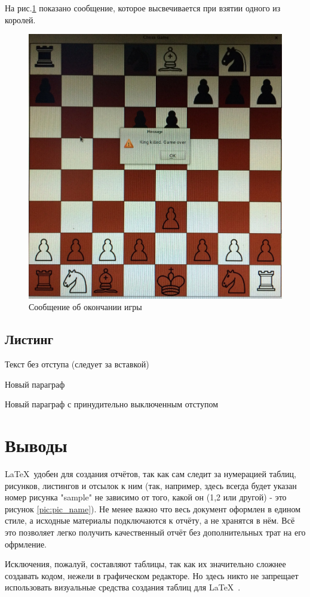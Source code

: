 На рис.\ref{pic:GUIgameOverMessege} показано сообщение, которое высвечивается при взятии одного из королей.\\
\begin{figure}[H]
	\begin{center}
		\includegraphics[scale=0.1]{pics/gui1.jpg}
		\caption{Сообщение об окончании игры} 
		\label{pic:GUIgameOverMessege} %
	\end{center}
\end{figure}

\subsection{Листинг}

%
Текст без отступа (следует за вставкой)

Новый параграф

\noindent Новый параграф с принудительно выключенным отступом



\section{Выводы}
\LaTeX\ удобен для создания отчётов, так как сам следит за нумерацией таблиц, рисунков, листингов и отсылок к ним (так, например, здесь всегда будет указан номер рисунка "sample" не зависимо от того, какой он (1,2 или другой) - это рисунок \ref{pic:pic_name}). Не менее важно что весь документ оформлен в едином стиле, а исходные материалы подключаются к отчёту, а не хранятся в нём. Всё это позволяет легко получить качественный отчёт без дополнительных трат на его офрмление.

Исключения, пожалуй, составляют таблицы, так как их значительно сложнее создавать кодом, нежели в графическом редакторе. Но здесь никто не запрещает использовать визуальные средства создания таблиц для \LaTeX\ .


